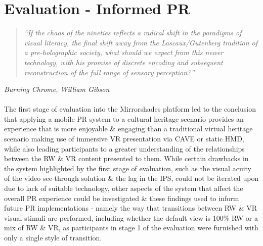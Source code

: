 

\chapter{Evaluation - Informed PR}


\begin{quote}
	\textit{``If the chaos of the nineties reflects a radical shift in the paradigms of visual literacy, the final shift away from the Lascaux/Gutenberg tradition of a pre-holographic society, what should we expect from this newer technology, with his promise of discrete encoding and subsequent reconstruction of the full range of sensory perception?''}
\end{quote}
\hfill \textit{Burning Chrome, William Gibson}
\\
\\


The first stage of evaluation into the Mirrorshades platform led to the conclusion that applying a mobile PR system to a cultural heritage scenario provides an experience that is more enjoyable \& engaging than a traditional virtual heritage scenario making use of immersive VR presentation via CAVE or static HMD, while also leading participants to a greater understanding of the relationships between the RW \& VR content presented to them. While certain drawbacks in the system highlighted by the first stage of evaluation, such as the visual acuity of the video see-through solution \& the lag in the IPS, could not be iterated upon due to lack of suitable technology, other aspects of the system that affect the overall PR experience could be investigated \& these findings used to inform future PR implementations - namely the way that transitions between RW \& VR visual stimuli are performed, including whether the default view is 100\% RW or a mix of RW \& VR, as participants in stage 1 of the evaluation were furnished with only a single style of transition.

